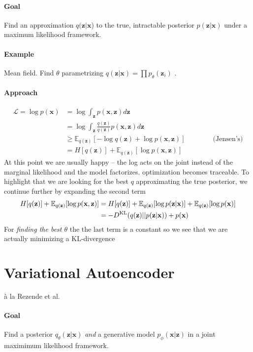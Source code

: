 \documentclass[a4paper,10pt]{article}
\newcommand\x{\mathbf x}
\newcommand\z{\mathbf z}
\newcommand\E{\mathbb E}
\newcommand\DKL[2]{D^\text{KL}\!\left(#1||#2\right)}
\begin{document}
\paragraph{Goal} Find an approximation $q(\z|\x$) to the true, intractable posterior  $p(\z|\x)$ under a maximum likelihood framework.
\paragraph{Example} Mean field. Find $\theta$ parametrizing $q(\z|\x)=\prod p_\theta(\z_i)$ .
\paragraph{Approach}
\begin{align}
	\mathcal L=\log p(\x)&=\log\int_\z p(\x,\z)d\z\\
	&=\log\int_\z \frac{q(\z)}{q(\z)}p(\x,\z)d\z\\
	&\geq\E_{q(\z)}[-\log q(\z) + \log p(\x,\z)]\qquad\qquad\text{(Jensen's)}\\
	&=H[q(\z)] + \E_{q(\z)}[\log p(\x,\z)]
\end{align}
At this point we are usually happy -- the log acts on the joint instead of the marginal likelihood and the model factorizes. optimization becomes traceable. To highlight that we are looking for the best $q$ approximating the true posterior, we continue further by expanding the second term
\begin{align}
	H[q(\z)] + \E_{q(\z)}[\log p(\x,\z)]&=H[q(\z)] + \E_{q(\z)}[\log p(\z|\x)] + \E_{q(\z)}[\log p(\x)]\notag\\
	&=-\DKL{q(\z)}{p(\z|\x)} + p(\x)
\end{align}
For \emph{finding the best $\theta$} the the last term is a constant so we see that we are actually minimizing a KL-divergence
\section{Variational Autoencoder}
\`a la Rezende et al.
\paragraph{Goal}Find a posterior $q_\theta(\z|\x)$ \emph{and} a generative model $p_\phi(\x|\z)$ in a joint maximimum likelihood framework.
\end{document}
